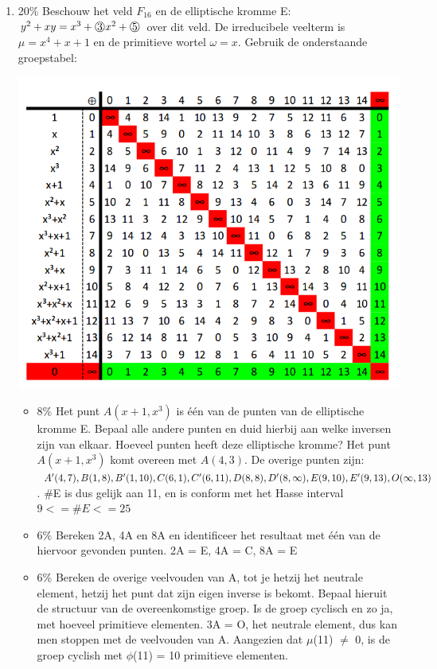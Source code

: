 \documentclass{article}
\def\note#1{\color{cyan} #1 \color{black}}
\def\circled#1{\raisebox{.5pt}{\textcircled{\raisebox{-.9pt} {#1}}}}
\begin{document}
\begin{enumerate}
\item {\note{20\%} Beschouw het veld $F_{16}$ en de elliptische kromme E: $y^2+xy = x^3 + \circled{3}x^2 + \circled{5} $ over dit veld. De irreducibele veelterm is $\mu = x^4 + x + 1$ en de primitieve wortel $\omega = x$. Gebruik de onderstaande groepstabel: 
\begin{center}
 \includegraphics[width=\linewidth]{groepstabel}
\end{center}


    \begin{itemize}
    \item {\note{8\%} Het punt $A(x + 1, x^3)$ is één van de punten van de elliptische kromme E. Bepaal alle andere punten en duid hierbij aan welke inversen zijn van elkaar. Hoeveel punten heeft deze elliptische kromme?}
    \note{Het punt $A(x + 1, x^3)$ komt overeen met $A(4, 3)$. De overige punten zijn: $A'(4, 7), B(1, 8), B'(1, 10), C(6, 1), C'(6, 11), D(8, 8), D'(8, \infty), \\ E(9, 10), E'(9, 13), O(\infty, 13)$.
    \#E is dus gelijk aan 11, en is conform met het Hasse interval $9 <= \#E <= 25$ }
    \item {\note{6\%} Bereken 2A, 4A en 8A en identificeer het resultaat met één van de hiervoor gevonden punten.}
    \note{ 2A = E, 4A = C, 8A = E}
      \item {\note{6\%} Bereken de overige veelvouden van A, tot je hetzij het neutrale element, hetzij het punt dat zijn eigen inverse is bekomt. Bepaal hieruit de structuur van de overeenkomstige groep. Is de groep cyclisch en zo ja, met hoeveel primitieve elementen. \note{3A = O, het neutrale element, dus kan men stoppen met de veelvouden van A. Aangezien dat $\mu$(11) $\neq$ 0, is de groep cyclish met $\phi$(11) = 10 primitieve elementen. }}


\end{itemize}}
\end{enumerate}
\end{document}
